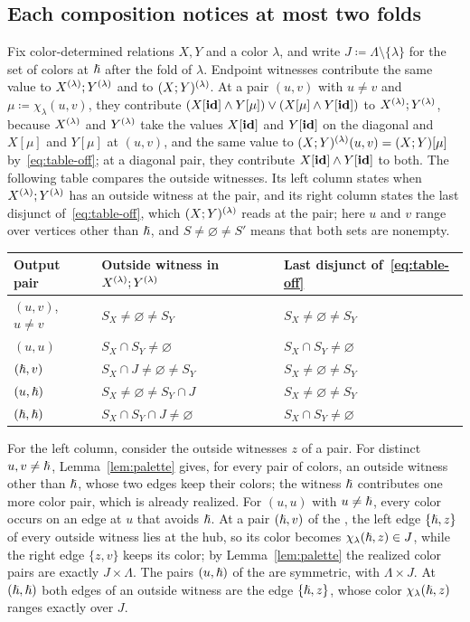 \subsection{Each composition notices at most two folds}\label{sec:responses}
Fix color-determined relations $X,Y$ and a color $\lambda$, and write
$J\coloneqq\Lambda\setminus\{\lambda\}$ for the set of colors at $\hslash$
after the fold of $\lambda$.
Endpoint witnesses contribute the same value to
$X^{(\lambda)};Y^{(\lambda)}$ and to $(X;Y)^{(\lambda)}$. At a pair
$(u,v)$ with $u\ne v$ and $\mu\coloneqq\chi_\lambda(u,v)$, they contribute
$(X[\mathbf{id}]\land Y[\mu])\lor(X[\mu]\land Y[\mathbf{id}])$ to
$X^{(\lambda)};Y^{(\lambda)}$, because $X^{(\lambda)}$ and
$Y^{(\lambda)}$ take the values $X[\mathbf{id}]$ and $Y[\mathbf{id}]$ on the
diagonal and $X[\mu]$ and $Y[\mu]$ at $(u,v)$, and the same value to
$(X;Y)^{(\lambda)}(u,v)=(X;Y)[\mu]$ by~\eqref{eq:table-off}; at a
diagonal pair, they contribute $X[\mathbf{id}]\land Y[\mathbf{id}]$ to both. The
following table compares the outside witnesses. Its left column states
when $X^{(\lambda)};Y^{(\lambda)}$ has an outside witness at the pair,
and its right column states the last disjunct of~\eqref{eq:table-off},
which $(X;Y)^{(\lambda)}$ reads at the pair; here $u$ and $v$ range
over vertices other than $\hslash$, and $S\ne\varnothing\ne S'$ means that
both sets are nonempty.
\begin{center}
\renewcommand{\arraystretch}{1.15}
\begin{tabular}{lll}
\toprule
Output pair & Outside witness in $X^{(\lambda)};Y^{(\lambda)}$
 & Last disjunct of~\eqref{eq:table-off}\\
\midrule
$(u,v)$, $u\ne v$ & $S_X\ne\varnothing\ne S_Y$ & $S_X\ne\varnothing\ne S_Y$\\
$(u,u)$ & $S_X\cap S_Y\ne\varnothing$ & $S_X\cap S_Y\ne\varnothing$\\
$(\hslash,v)$ & $S_X\cap J\ne\varnothing\ne S_Y$ & $S_X\ne\varnothing\ne S_Y$\\
$(u,\hslash)$ & $S_X\ne\varnothing\ne S_Y\cap J$ & $S_X\ne\varnothing\ne S_Y$\\
$(\hslash,\hslash)$ & $S_X\cap S_Y\cap J\ne\varnothing$ & $S_X\cap S_Y\ne\varnothing$\\
\bottomrule
\end{tabular}
\end{center}
For the left column, consider the outside witnesses $z$ of a pair. For
distinct $u,v\ne\hslash$, Lemma~\ref{lem:palette} gives, for every pair of
colors, an outside witness other than $\hslash$, whose two edges keep their
colors; the witness $\hslash$ contributes one more color pair, which is
already realized. For $(u,u)$ with $u\ne\hslash$, every color occurs on an
edge at $u$ that avoids $\hslash$. At a pair $(\hslash,v)$ of the
, the left edge $\{\hslash,z\}$ of every outside witness lies
at the hub, so its color becomes $\chi_\lambda(\hslash,z)\in J$, while the
right edge $\{z,v\}$ keeps its color; by Lemma~\ref{lem:palette} the
realized color pairs are exactly $J\times\Lambda$. The pairs $(u,\hslash)$
of the  are symmetric, with $\Lambda\times J$. At
$(\hslash,\hslash)$ both edges of an outside witness are the edge
$\{\hslash,z\}$, whose color $\chi_\lambda(\hslash,z)$ ranges exactly over $J$.


